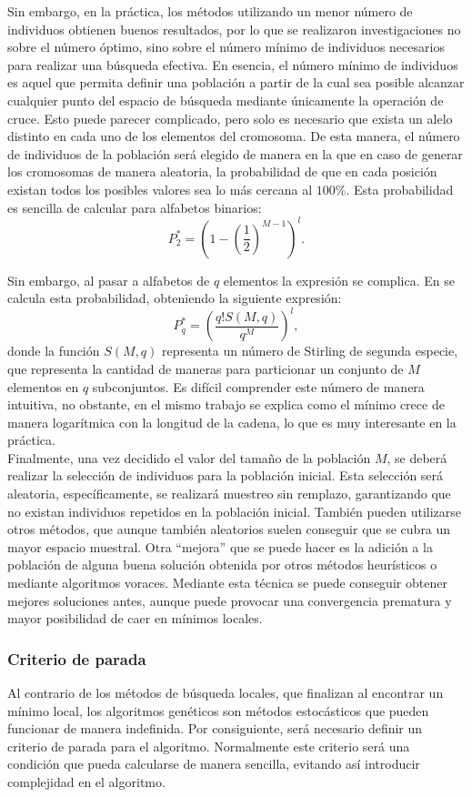 Sin embargo, en la práctica, los métodos utilizando un menor número de individuos obtienen buenos resultados, por lo que se realizaron investigaciones no sobre el número óptimo, sino sobre el número mínimo de individuos necesarios para realizar una búsqueda efectiva. En esencia, el número mínimo de individuos es aquel que permita definir una población a partir de la cual sea posible alcanzar cualquier punto del espacio de búsqueda mediante únicamente la operación de cruce. Esto puede parecer complicado, pero solo es necesario que exista un alelo distinto en cada uno de los elementos del cromosoma. De esta manera, el número de individuos de la población será elegido de manera en la que en caso de generar los cromosomas de manera aleatoria, la probabilidad de que en cada posición existan todos los posibles valores sea lo más cercana al $100\%$. Esta probabilidad es sencilla de calcular para alfabetos binarios:
$$P_2^*=(1-(\frac{1}{2})^{M-1})^l.$$

Sin embargo, al pasar a alfabetos de $q$ elementos la expresión se complica. En \cite{colin-pq} se calcula esta probabilidad, obteniendo la siguiente expresión:
$$P_q^*=\left(\frac{q!S(M,q)}{q^M}\right)^l,$$
donde la función $S(M,q)$ representa un número de Stirling de segunda especie, que representa la cantidad de maneras para particionar un conjunto de $M$ elementos en $q$ subconjuntos. Es difícil comprender este número de manera intuitiva, no obstante, en el mismo trabajo se explica como el mínimo crece de manera logarítmica con la longitud de la cadena, lo que es muy interesante en la práctica.\\

Finalmente, una vez decidido el valor del tamaño de la población $M$, se deberá realizar la selección de individuos para la población inicial. Esta selección será aleatoria, específicamente, se realizará muestreo sin remplazo, garantizando que no existan individuos repetidos en la población inicial. También pueden utilizarse otros métodos, que aunque también aleatorios suelen conseguir que se cubra un mayor espacio muestral. Otra ``mejora'' que se puede hacer es la adición a la población de alguna buena solución obtenida por otros métodos heurísticos o mediante algoritmos voraces. Mediante esta técnica se puede conseguir obtener mejores soluciones antes, aunque puede provocar una convergencia prematura y mayor posibilidad de caer en mínimos locales.

\subsubsection{Criterio de parada}\label{intro:sel-criterio}
Al contrario de los métodos de búsqueda locales, que finalizan al encontrar un mínimo local, los algoritmos genéticos son métodos estocásticos que pueden funcionar de manera indefinida. Por consiguiente, será necesario definir un criterio de parada para el algoritmo. Normalmente este criterio será una condición que pueda calcularse de manera sencilla, evitando así introducir complejidad en el algoritmo.\\

